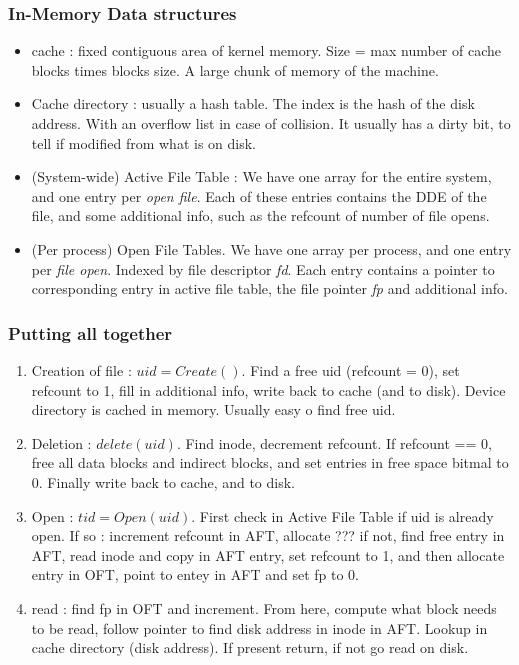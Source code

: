 \documentclass[12pt,a4paper]{article}
\begin{document}
\subsubsection{In-Memory Data structures}
\begin{itemize}
	\item cache : fixed contiguous area of kernel memory. Size = max number of cache blocks times blocks size. A large chunk of memory of the machine.
	\item Cache directory : usually a hash table. The index is the hash of the disk address. With an overflow list in case of collision. It usually has a dirty bit, to tell if modified from what is on disk. 
	\item (System-wide) Active File Table : We have one array for the entire system, and one entry per \textit{open file}. Each of these entries contains the DDE of the file, and some additional info, such as the refcount of number of file opens. 
	\item (Per process) Open File Tables. We have one array per process, and one entry per \textit{file open}. Indexed by file descriptor \textit{fd}. Each entry contains a pointer to corresponding entry in active file table, the file pointer \textit{fp} and additional info. 
\end{itemize}

\subsubsection{Putting all together}
\begin{enumerate}
	\item Creation of file : $uid = Create()$. Find a free uid (refcount = 0), set refcount to 1, fill in additional info, write back to cache (and to disk). Device directory is cached in memory. Usually easy o find free uid. 
	\item Deletion :  $delete(uid)$. Find inode, decrement refcount. If refcount == 0, free all data blocks and indirect blocks, and set entries in free space bitmal to 0. Finally write back to cache, and to disk. 
	\item Open : $tid = Open(uid)$. First check in Active File Table if uid is already open. If so : increment refcount in AFT, allocate ??? if not, find free entry in AFT, read inode and copy in AFT entry, set refcount to 1, and then allocate entry in OFT, point to entey in AFT and set fp to 0. 
	\item read : find fp in OFT and increment. From here, compute what block needs to be read, follow pointer to find disk address in inode in AFT. Lookup in cache directory (disk address). If present return, if not go read on disk. 
\end{enumerate}
\end{document}
